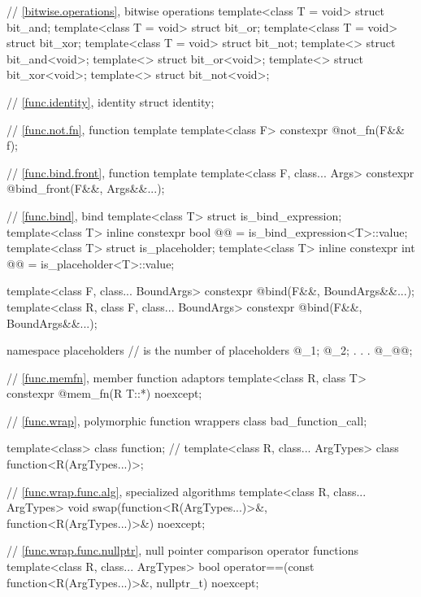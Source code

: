 \begin{codeblock}
{  // \ref{bitwise.operations}, bitwise operations
  template<class T = void> struct bit_and;
  template<class T = void> struct bit_or;
  template<class T = void> struct bit_xor;
  template<class T = void> struct bit_not;
  template<> struct bit_and<void>;
  template<> struct bit_or<void>;
  template<> struct bit_xor<void>;
  template<> struct bit_not<void>;

  // \ref{func.identity}, identity
  struct identity;

  // \ref{func.not.fn}, function template 
  template<class F> constexpr @\unspec@ not_fn(F&& f);

  // \ref{func.bind.front}, function template 
  template<class F, class... Args> constexpr @\unspec@ bind_front(F&&, Args&&...);

  // \ref{func.bind}, bind
  template<class T> struct is_bind_expression;
  template<class T>
    inline constexpr bool @@ = is_bind_expression<T>::value;
  template<class T> struct is_placeholder;
  template<class T>
    inline constexpr int @@ = is_placeholder<T>::value;

  template<class F, class... BoundArgs>
    constexpr @\unspec@ bind(F&&, BoundArgs&&...);
  template<class R, class F, class... BoundArgs>
    constexpr @\unspec@ bind(F&&, BoundArgs&&...);

  namespace placeholders {
    //  is the  number of placeholders
    @\seebelownc@ _1;
    @\seebelownc@ _2;
               .
               .
               .
    @\seebelownc@ _@@;
  }

  // \ref{func.memfn}, member function adaptors
  template<class R, class T>
    constexpr @\unspec@ mem_fn(R T::*) noexcept;

  // \ref{func.wrap}, polymorphic function wrappers
  class bad_function_call;

  template<class> class function;       // \notdef
  template<class R, class... ArgTypes> class function<R(ArgTypes...)>;

  // \ref{func.wrap.func.alg}, specialized algorithms
  template<class R, class... ArgTypes>
    void swap(function<R(ArgTypes...)>&, function<R(ArgTypes...)>&) noexcept;

  // \ref{func.wrap.func.nullptr}, null pointer comparison operator functions
  template<class R, class... ArgTypes>
    bool operator==(const function<R(ArgTypes...)>&, nullptr_t) noexcept;

}
\end{codeblock}
